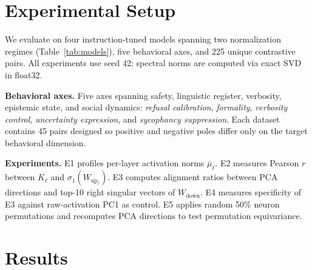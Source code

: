 \documentclass{article}
\newcommand{\mubar}{\bar{\mu}}
\newcommand{\sone}{\sigma_1}
\newcommand{\Wup}{W_{\!\mathrm{up}}}
\newcommand{\Wdn}{W_{\!\mathrm{down}}}
\begin{document}
\section{Experimental Setup}
\label{sec:setup}

We evaluate on four instruction-tuned models spanning two normalization regimes
(Table~\ref{tab:models}), five behavioral axes, and 225 unique contrastive pairs.
All experiments use seed 42; spectral norms are computed via exact SVD in float32.

\begin{table}[h]
\centering
\caption{Models evaluated. All are instruction-tuned open-weight models.}
\label{tab:models}
\vskip 0.05in
\end{table}

\noindent\textbf{Behavioral axes.}
Five axes spanning safety, linguistic register, verbosity, epistemic state, and social
dynamics: \textit{refusal calibration}, \textit{formality}, \textit{verbosity control},
\textit{uncertainty expression}, and \textit{sycophancy suppression}.
Each dataset contains 45 pairs designed so positive and negative poles differ only on
the target behavioral dimension.

\noindent\textbf{Experiments.}
E1 profiles per-layer activation norms $\mubar_\ell$.
E2 measures Pearson $r$ between $K_\ell$ and $\sone(\Wup_\ell)$.
E3 computes alignment ratios between PCA directions and top-10 right singular vectors
of $\Wdn$.
E4 measures specificity of E3 against raw-activation PC1 as control.
E5 applies random 50\% neuron permutations and recomputes PCA directions to test
permutation equivariance.

\section{Results}
\label{sec:results}
\end{document}
